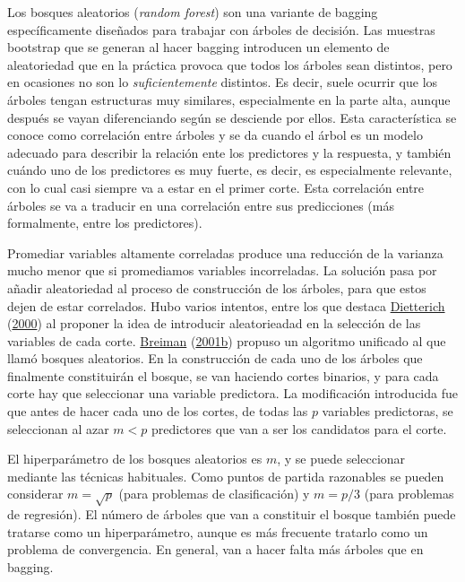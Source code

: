 \documentclass[
  spanish,
]{book}
\theoremstyle{break}
\theoremstyle{definition}
\theoremstyle{definition}
\theoremstyle{definition}
\theoremstyle{definition}
\theoremstyle{remark}
\begin{document}
Los bosques aleatorios (\emph{random forest}) son una variante de bagging específicamente diseñados para trabajar con árboles de decisión.
Las muestras bootstrap que se generan al hacer bagging introducen un elemento de aleatoriedad que en la práctica provoca que todos los árboles sean distintos, pero en ocasiones no son lo \emph{suficientemente} distintos.
Es decir, suele ocurrir que los árboles tengan estructuras muy similares, especialmente en la parte alta, aunque después se vayan diferenciando según se desciende por ellos.
Esta característica se conoce como correlación entre árboles y se da cuando el árbol es un modelo adecuado para describir la relación ente los predictores y la respuesta, y también cuándo uno de los predictores es muy fuerte, es decir, es especialmente relevante, con lo cual casi siempre va a estar en el primer corte.
Esta correlación entre árboles se va a traducir en una correlación entre sus predicciones (más formalmente, entre los predictores).

Promediar variables altamente correladas produce una reducción de la varianza mucho menor que si promediamos variables incorreladas.
La solución pasa por añadir aleatoriedad al proceso de construcción de los árboles, para que estos dejen de estar correlados.
Hubo varios intentos, entre los que destaca \protect\hyperlink{ref-dietterich2000experimental}{Dietterich} (\protect\hyperlink{ref-dietterich2000experimental}{2000}) al proponer la idea de introducir aleatorieadad en la selección de las variables de cada corte.
\protect\hyperlink{ref-breiman2001statistical}{Breiman} (\protect\hyperlink{ref-breiman2001statistical}{2001b}) propuso un algoritmo unificado al que llamó bosques aleatorios.
En la construcción de cada uno de los árboles que finalmente constituirán el bosque, se van haciendo cortes binarios, y para cada corte hay que seleccionar una variable predictora.
La modificación introducida fue que antes de hacer cada uno de los cortes, de todas las \(p\) variables predictoras, se seleccionan al azar \(m < p\) predictores que van a ser los candidatos para el corte.

El hiperparámetro de los bosques aleatorios es \(m\), y se puede seleccionar mediante las técnicas habituales.
Como puntos de partida razonables se pueden considerar \(m = \sqrt{p}\) (para problemas de clasificación) y \(m = p/3\) (para problemas de regresión).
El número de árboles que van a constituir el bosque también puede tratarse como un hiperparámetro, aunque es más frecuente tratarlo como un problema de convergencia.
En general, van a hacer falta más árboles que en bagging.
\end{document}
